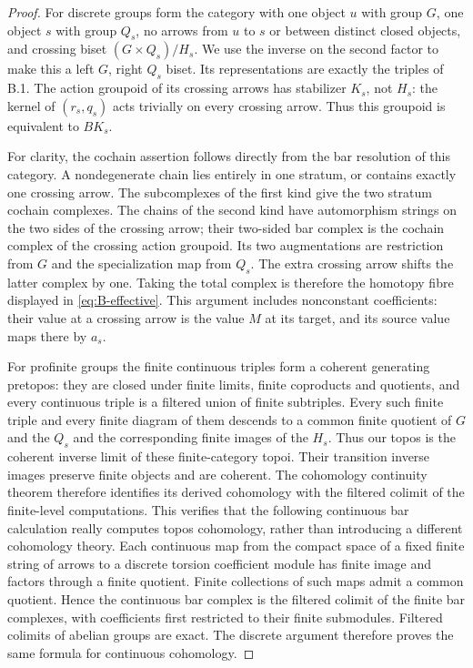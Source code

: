 \begin{proof}
For discrete groups form the category with one object $u$ with group
$G$, one object $s$ with group $Q_s$, no arrows from $u$ to $s$ or
between distinct closed objects, and crossing biset
$(G\times Q_s)/H_s$. We use the inverse on the second factor to make
this a left $G$, right $Q_s$ biset. Its representations are exactly
the triples of B.1. The action groupoid of its crossing arrows has
stabilizer $K_s$, not $H_s$: the kernel of $(r_s,q_s)$ acts trivially
on every crossing arrow. Thus this groupoid is equivalent to $BK_s$.

For clarity, the cochain assertion follows directly from the bar
resolution of this category. A nondegenerate chain lies entirely in
one stratum, or contains exactly one crossing arrow. The subcomplexes
of the first kind give the two stratum cochain complexes. The chains
of the second kind have automorphism strings on the two sides of the
crossing arrow; their two-sided bar complex is the cochain complex of
the crossing action groupoid. Its two augmentations are restriction
from $G$ and the specialization map from $Q_s$. The extra crossing
arrow shifts the latter complex by one. Taking the total complex is
therefore the homotopy fibre displayed in \eqref{eq:B-effective}.
This argument includes nonconstant coefficients: their value at a
crossing arrow is the value $M$ at its target, and its source value
maps there by $a_s$.

For profinite groups the finite continuous triples form a coherent
generating pretopos: they are closed under finite limits, finite
coproducts and quotients, and every continuous triple is a filtered
union of finite subtriples. Every such finite triple and every finite
diagram of them descends to a common finite quotient of $G$ and the
$Q_s$ and the corresponding finite images of the $H_s$. Thus our
topos is the coherent inverse limit of these finite-category topoi.
Their transition inverse images preserve finite objects and are
coherent. The cohomology continuity theorem
\citep[VI, Corollary~8.7.7, with 8.7.1 and Remark~8.7.8]{SGA4II}
therefore identifies its derived cohomology with the filtered
colimit of the finite-level computations. This verifies that the
following continuous bar calculation really computes topos
cohomology, rather than introducing a different cohomology theory.
Each continuous map
from the compact space of a fixed finite string of arrows to a
discrete torsion coefficient module has finite image and factors
through a finite quotient. Finite collections of such maps admit a
common quotient. Hence the continuous bar complex is the filtered
colimit of the finite bar complexes, with coefficients first restricted
to their finite submodules. Filtered colimits of abelian groups are
exact. The discrete argument therefore proves the same formula for
continuous cohomology.


\end{proof}
